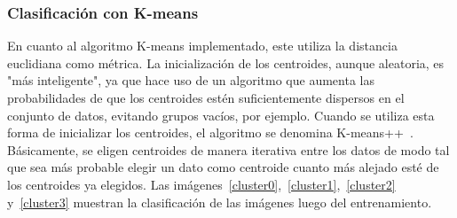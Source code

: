 \documentclass[a4paper, 12pt]{article}
\begin{document}
\subsubsection{Clasificación con K-means}

En cuanto al algoritmo K-means implementado, este utiliza la distancia euclidiana como métrica. La inicialización de los centroides, aunque aleatoria, es "más inteligente", ya que hace uso de un algoritmo que aumenta las probabilidades de que los centroides estén suficientemente dispersos en el conjunto de datos, evitando grupos vacíos, por ejemplo. Cuando se utiliza esta forma de inicializar los centroides, el algoritmo se denomina K-means++~\cite{referencia}. Básicamente, se eligen centroides de manera iterativa entre los datos de modo tal que sea más probable elegir un dato como centroide cuanto más alejado esté de los centroides ya elegidos.
Las imágenes~\ref{cluster0},~\ref{cluster1},~\ref{cluster2} y~\ref{cluster3} muestran la clasificación de las imágenes luego del entrenamiento.
\end{document}
